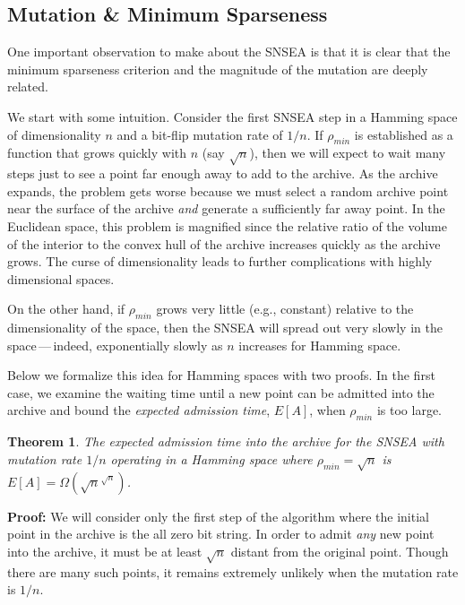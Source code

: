 \documentclass[twoside]{article}
\newtheorem{theorem}{Theorem}
\begin{document}
\subsection{Mutation \& Minimum Sparseness}
\label{subsec:mutation}
One important observation to make about the SNSEA is that it is clear that the minimum sparseness criterion and the magnitude of the mutation are deeply related.  

We start with some intuition.  Consider the first SNSEA step in a Hamming space of dimensionality $n$ and a bit-flip mutation rate of $1/n$.  If $\rho_{min}$ is established as a function that grows quickly with $n$ (say $\sqrt{n}$), then we will expect to wait many steps just to see a point far enough away to add to the archive.  As the archive expands, the problem gets worse because we must select a random archive point near the surface of the archive \emph{and} generate a sufficiently far away point.  In the Euclidean space, this problem is magnified since the relative ratio of the volume of the interior to the convex hull of the archive increases quickly as the archive grows.  The curse of dimensionality leads to further complications with highly dimensional spaces.

On the other hand, if $\rho_{min}$ grows very little (e.g., constant) relative to the dimensionality of the space, then the SNSEA will spread out very slowly in the space\,---\,indeed, exponentially slowly as $n$ increases for Hamming space.  

Below we formalize this idea for Hamming spaces with two proofs.  In the first case, we examine the waiting time until a new point can be admitted into the archive and bound the \emph{expected admission time}, $E[A]$, when $\rho_{min}$ is too large.  

\begin{theorem}
The expected admission time into the archive for the SNSEA with mutation rate $1/n$ operating in a Hamming space where $\rho_{min} = \sqrt{n}$ is $E[A] = \Omega(\sqrt{n}^{\sqrt{n}})$.
\end{theorem}
\textbf{Proof:} We will consider only the first step of the algorithm where the initial point in the archive is the all zero bit string.  In order to admit \emph{any} new point into the archive, it must be at least $\sqrt{n}$ distant from the original point.  Though there are many such points, it remains extremely unlikely when the mutation rate is $1/n$.
\end{document}
